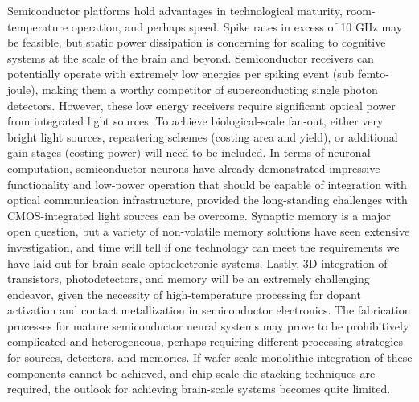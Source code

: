 \documentclass[twocolumn]{article}
\begin{document}
Semiconductor platforms hold advantages in technological maturity, room-temperature operation, and perhaps speed. Spike rates in excess of 10 GHz may be feasible, but static power dissipation is concerning for scaling to cognitive systems at the scale of the brain and beyond. Semiconductor receivers can potentially operate with extremely low energies per spiking event (sub femto-joule), making them a worthy competitor of superconducting single photon detectors. However, these low energy receivers require significant optical power from integrated light sources. To achieve biological-scale fan-out, either very bright light sources, repeatering schemes (costing area and yield), or additional gain stages (costing power) will need to be included. In terms of neuronal computation, semiconductor neurons have already demonstrated impressive functionality and low-power operation that should be capable of integration with optical communication infrastructure, provided the long-standing challenges with CMOS-integrated light sources can be overcome. Synaptic memory is a major open question, but a variety of non-volatile memory solutions have seen extensive investigation, and time will tell if one technology can meet the requirements we have laid out for brain-scale optoelectronic systems. Lastly, 3D integration of transistors, photodetectors, and memory will be an extremely challenging endeavor, given the necessity of high-temperature processing for dopant activation and contact metallization in semiconductor electronics. The fabrication processes for mature semiconductor neural systems may prove to be prohibitively complicated and heterogeneous, perhaps requiring different processing strategies for sources, detectors, and memories. If wafer-scale monolithic integration of these components cannot be achieved, and chip-scale die-stacking techniques are required, the outlook for achieving brain-scale systems becomes quite limited.
\end{document}
